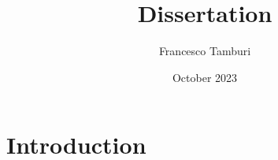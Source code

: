 \documentclass{report}
\title{Dissertation}
\author{Francesco Tamburi}
\date{October 2023}
\begin{document}
\maketitle

\chapter*{Introduction}


\end{document}
